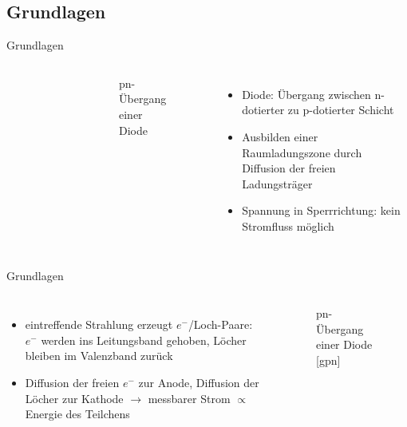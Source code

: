 \subsection[]{Grundlagen}

\begin{frame}{Grundlagen}
    \begin{columns}[T]
			\begin{figure}[htbp]
			  \centering
			  
			\end{figure}
			\begin{figure}[htbp]
			  \centering
			   
			  \caption{pn-Übergang einer Diode}
			\end{figure}
			
	    	\begin{itemize}
	    	  \item Diode: Übergang zwischen n-dotierter zu p-dotierter Schicht
			  \item Ausbilden einer Raumladungszone durch Diffusion der freien Ladungsträger
			  \item Spannung in Sperrrichtung: kein Stromfluss möglich
			\end{itemize}
    \end{columns}
\end{frame}

\begin{frame}{Grundlagen}
    \begin{columns}[T]	
	    	\begin{itemize}
	    	  \item eintreffende Strahlung erzeugt $e^-$/Loch-Paare: $e^-$ werden ins Leitungsband
	    	  gehoben, Löcher bleiben im Valenzband zurück
	    	  \item Diffusion der freien $e^-$ zur Anode, Diffusion der Löcher zur Kathode $\rightarrow$
	    	  messbarer Strom $\propto$ Energie des Teilchens
			\end{itemize}
			
			\begin{figure}[htbp]
			  \centering
			   
			  \caption{pn-Übergang einer Diode [gpn]}
			\end{figure}
    \end{columns}
\end{frame}